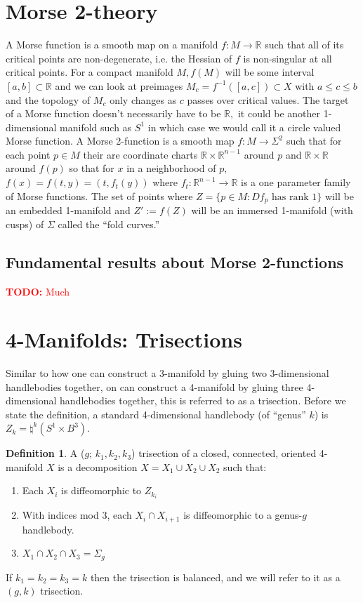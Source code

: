 \documentclass{amsart}
\def\todo#1{\textcolor{red}{\textbf{TODO: }{#1}}}
\theoremstyle{definition}
\newtheorem{definition}[theorem]{Definition}
\begin{document}
\section{Morse 2-theory}
A Morse function is a smooth map on a manifold $f: M \rightarrow \mathbb{R}$ such that all of its critical points are non-degenerate, i.e. the Hessian of $f$ is non-singular at all critical points. For a compact manifold $M, f(M)$ will be some interval $[a,b] \subset \mathbb{R}$ and we can look at preimages $M_{c} = f^{-1}([a, c]) \subset X$ with $a \leq c \leq b$ and the topology of $M_{c}$ only changes as $c$ passes over critical values. \newline \newline The target of a Morse function doesn't necessarily have to be $\mathbb{R},$ it could be another 1-dimensional manifold such as $S^{1}$ in which case we would call it a circle valued Morse function. A Morse 2-function is a smooth map $f: M \rightarrow \Sigma^{2}$ such that for each point $p \in M$ their are coordinate charts $\mathbb{R} \times \mathbb{R}^{n-1}$ around $p$ and $\mathbb{R} \times \mathbb{R}$ around $f(p)$ so that for $x$ in a neighborhood of $p,$ $f(x) = f(t, y) = (t, f_{t}(y))$ where $f_{t}: \mathbb{R}^{n-1} \rightarrow \mathbb{R}$ is a one parameter family of Morse functions. The set of points where $Z = \{p \in M : Df_{p} \text{  has rank 1} \}$ will be an embedded 1-manifold and $Z' := f(Z)$ will be an immersed 1-manifold (with cusps) of $\Sigma$ called the ``fold curves.''
\subsection{Fundamental results about Morse 2-functions}
\todo{Much}

\section{4-Manifolds: Trisections}

Similar to how one can construct a 3-manifold by gluing two 3-dimensional handlebodies together, on can construct a 4-manifold by gluing three 4-dimensional handlebodies together, this is referred to as a trisection. Before we state the definition, a standard 4-dimensional handlebody (of ``genus'' $k$) is $Z_{k} = \natural^{k}(S^{1} \times B^{3}).$
\begin{definition} A ($g$; $k_{1}, k_{2}, k_{3}$) trisection of a closed, connected, oriented 4-manifold $X$ is a decomposition $X = X_{1} \cup X_{2} \cup X_{2}$ such that: 
\begin{enumerate}
\item Each $X_{i}$ is diffeomorphic to $Z_{k_{i}}$
\item With indices mod 3, each $X_{i} \cap X_{i + 1}$ is diffeomorphic to a genus-$g$ handlebody. 
\item $X_{1} \cap X_{2} \cap X_{3} = \Sigma_{g}$
\end{enumerate}
If $k_{1} = k_{2} = k_{3} = k$ then the trisection is balanced, and we will refer to it as a $(g, k)$ trisection.
\end{definition}
\end{document}
